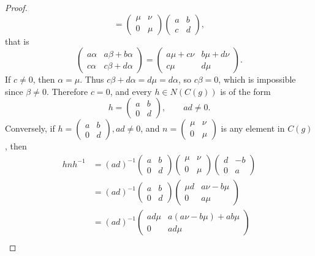 \documentclass[11pt,a4paper]{article}
\begin{document}
{\begin{proof}
$$= \begin{pmatrix} \mu & \nu\\ 0 & \mu \end{pmatrix} \begin{pmatrix} a & b\\ c & d \end{pmatrix},
$$
that is
$$
\begin{pmatrix} a\alpha & a \beta + b \alpha\\ c\alpha & c\beta + d \alpha \end{pmatrix} = \begin{pmatrix} a \mu + c \nu& b\mu + d \nu \\ c \mu& d \mu \end{pmatrix}.
$$
If $c \ne 0$, then $\alpha = \mu$. Thus $c \beta + d\alpha = d \mu = d\alpha$, so $c\beta = 0$, which is impossible since $\beta \ne 0$. Therefore $c=0$, and every $h \in N(C(g))$ is of the form
$$h = \begin{pmatrix} a & b\\ 0 & d \end{pmatrix}, \qquad ad \ne 0.$$
Conversely, if $h = \begin{pmatrix} a & b\\ 0 & d \end{pmatrix},  ad \ne 0$, and $n = \begin{pmatrix} \mu & \nu\\ 0 & \mu \end{pmatrix} $ is any element in $C(g)$, then
\begin{align*}
h n h^{-1}&= (ad)^{-1} \begin{pmatrix} a & b\\ 0 & d \end{pmatrix} \begin{pmatrix} \mu & \nu\\ 0 & \mu \end{pmatrix}  \begin{pmatrix} d & -b\\ 0 & a \end{pmatrix}\\
&=(ad)^{-1}\begin{pmatrix} a & b\\ 0 & d \end{pmatrix}  \begin{pmatrix} \mu d  & a \nu - b \mu\\ 0 & a \mu \end{pmatrix} \\
&=(ad)^{-1}\begin{pmatrix} a d \mu  & a(a\nu - b \mu) + ab \mu\\ 0 & ad \mu \end{pmatrix}\\

\end{align*}
\end{proof}}
\end{document}
